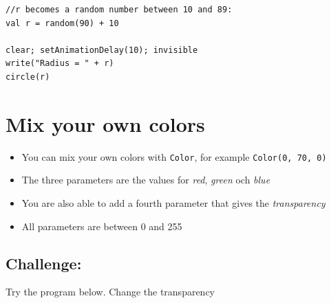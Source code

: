  

\begin{lstlisting}[basicstyle={\ttfamily\fontsize{20}{24}\selectfont},numbers=none]
//r becomes a random number between 10 and 89:
val r = random(90) + 10   

clear; setAnimationDelay(10); invisible
write("Radius = " + r)
circle(r)
\end{lstlisting}
        
\chapter{Mix your own colors}

\begin{itemize}

\item {You can mix your own colors with \lstinline{Color}, for example \lstinline{Color(0, 70, 0)}}
\item {The three parameters are the values for {\it red}, {\it green} och {\it blue}}
\item {You are also able to add a fourth parameter that gives the {\it transparency}}
\item {All parameters are between 0 and 255}

\end{itemize}


\section*{\color{BrickRed}Challenge:}
Try the program below. Change the transparency

